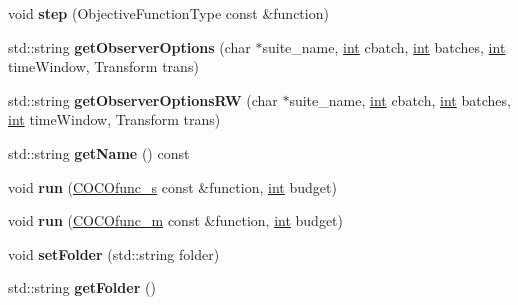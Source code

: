 \begin{DoxyCompactItemize}
\item 
void {\bfseries step} (Objective\+Function\+Type const \&function)\hypertarget{classCocoOptimiser_ae48180f04b5b40318b4c52cd02862239}{}\label{classCocoOptimiser_ae48180f04b5b40318b4c52cd02862239}

\item 
std\+::string {\bfseries get\+Observer\+Options} (char $\ast$suite\+\_\+name, \hyperlink{classint}{int} cbatch, \hyperlink{classint}{int} batches, \hyperlink{classint}{int} time\+Window, Transform trans)\hypertarget{classCocoOptimiser_ad9591d2b76f7078a956e7cdca1d8ba60}{}\label{classCocoOptimiser_ad9591d2b76f7078a956e7cdca1d8ba60}

\item 
std\+::string {\bfseries get\+Observer\+Options\+RW} (char $\ast$suite\+\_\+name, \hyperlink{classint}{int} cbatch, \hyperlink{classint}{int} batches, \hyperlink{classint}{int} time\+Window, Transform trans)\hypertarget{classCocoOptimiser_afc334f80b0aee491d2452f7f89402d17}{}\label{classCocoOptimiser_afc334f80b0aee491d2452f7f89402d17}

\item 
std\+::string {\bfseries get\+Name} () const \hypertarget{classCocoOptimiser_a265bd5d524ea5b10d5e9f4028cdc386c}{}\label{classCocoOptimiser_a265bd5d524ea5b10d5e9f4028cdc386c}

\item 
void {\bfseries run} (\hyperlink{classCOCOfunc__s}{C\+O\+C\+Ofunc\+\_\+s} const \&function, \hyperlink{classint}{int} budget)\hypertarget{classCocoOptimiser_a5842d02046cb097f0e11c84329f32799}{}\label{classCocoOptimiser_a5842d02046cb097f0e11c84329f32799}

\item 
void {\bfseries run} (\hyperlink{classCOCOfunc__m}{C\+O\+C\+Ofunc\+\_\+m} const \&function, \hyperlink{classint}{int} budget)\hypertarget{classCocoOptimiser_a1ad475649fa2f85129a8db7457cffeab}{}\label{classCocoOptimiser_a1ad475649fa2f85129a8db7457cffeab}

\item 
void {\bfseries set\+Folder} (std\+::string folder)\hypertarget{classCocoOptimiser_a2bfb5ff0b5420e95c6736070d4853eea}{}\label{classCocoOptimiser_a2bfb5ff0b5420e95c6736070d4853eea}

\item 
std\+::string {\bfseries get\+Folder} ()\hypertarget{classCocoOptimiser_aedb7b8bd6951c363b3ecbeb878cd0539}{}\label{classCocoOptimiser_aedb7b8bd6951c363b3ecbeb878cd0539}

\end{DoxyCompactItemize}
